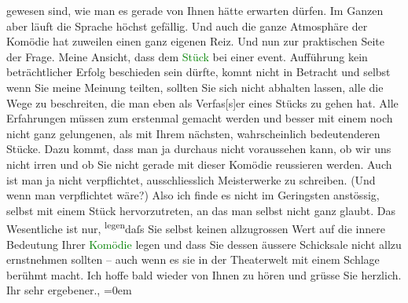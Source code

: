                gewesen sind, wie man es gerade von Ihnen hätte erwarten dürfen. Im Ganzen aber läuft
               die Sprache höchst gefällig. Und auch die ganze Atmosphäre der Komödie hat zuweilen
               einen ganz eigenen Reiz.\pend
           \pstart
           Und nun zur praktischen Seite der Frage. Meine Ansicht, dass dem \textcolor{green}{Stück}{} bei einer event. Aufführung kein
               beträchtlicher Erfolg beschieden sein dürfte, komnt nicht in Betracht und selbst wenn
               Sie meine Meinung teilten, sollten Sie sich nicht abhalten lassen, alle die Wege zu
               beschreiten, die man eben als Verfas{[}s{]}er eines Stücks zu gehen
               hat. Alle Erfahrungen müssen zum {\pb}erstenmal gemacht
               werden und besser mit einem noch nicht ganz gelungenen, als mit Ihrem nächsten,
               wahrscheinlich bedeutenderen Stücke. Dazu kommt, dass man ja durchaus nicht
               voraussehen kann, ob wir uns nicht irren und ob Sie nicht gerade mit dieser Komödie
                  reussieren werden. Auch ist man ja nicht
               verpflichtet, ausschliesslich Meisterwerke zu schreiben. (Und wenn man verpflichtet
               wäre?) Also ich finde es nicht im Geringsten anstössig, selbst mit einem Stück
               hervorzutreten, an das man selbst nicht ganz glaubt. Das Wesentliche ist nur, \substVorne{}\textsuperscript{legen}\substDazwischen{}daſs\substHinten{} Sie selbst keinen allzugrossen Wert auf die innere Bedeutung Ihrer \textcolor{green}{Komödie}{} legen und dass Sie dessen
               äussere Schicksale nicht allzu ernstnehmen sollten – auch wenn es sie in der
               Theaterwelt mit einem Schlage berühmt macht.\pend
           \pstart
           Ich hoffe bald wieder von Ihnen zu hören und grüsse Sie herzlich.{\\[\baselineskip]} Ihr sehr
               ergebener.,\pend
           \leftskip=0em{}\endnumbering{}  
      